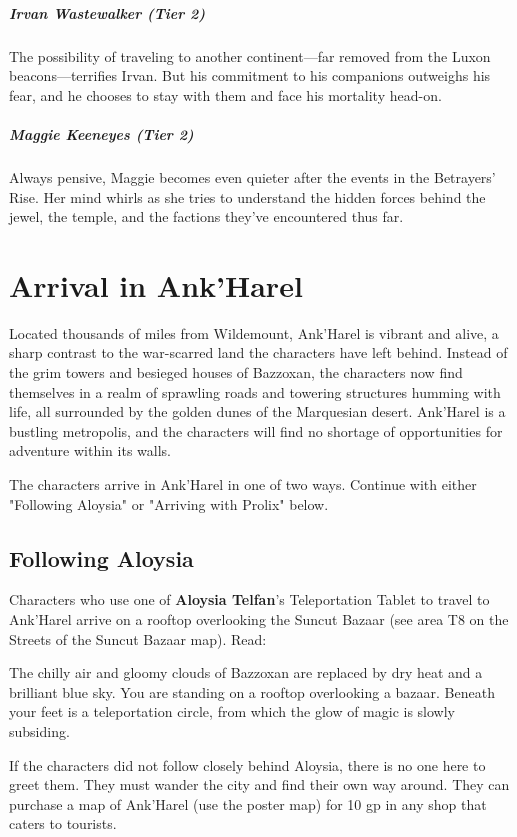 \documentclass[10pt,a4paper,twoside,bg=print,twocolumn,openany,nodeprecatedcode]{dndbook}
\begin{document}
\subparagraph{Irvan Wastewalker (Tier 2)}
The possibility of traveling to another continent—far removed from the Luxon beacons—terrifies Irvan. But his commitment to his companions outweighs his fear, and he chooses to stay with them and face his mortality head-on.

\subparagraph{Maggie Keeneyes (Tier 2)}
Always pensive, Maggie becomes even quieter after the events in the Betrayers' Rise. Her mind whirls as she tries to understand the hidden forces behind the jewel, the temple, and the factions they've encountered thus far.

\section{Arrival in Ank'Harel}
Located thousands of miles from Wildemount, Ank'Harel is vibrant and alive, a sharp contrast to the war-scarred land the characters have left behind. Instead of the grim towers and besieged houses of Bazzoxan, the characters now find themselves in a realm of sprawling roads and towering structures humming with life, all surrounded by the golden dunes of the Marquesian desert. Ank'Harel is a bustling metropolis, and the characters will find no shortage of opportunities for adventure within its walls.

The characters arrive in Ank'Harel in one of two ways. Continue with either "Following Aloysia" or "Arriving with Prolix" below.

\subsection{Following Aloysia}
Characters who use one of \textbf{Aloysia Telfan}'s Teleportation Tablet to travel to Ank'Harel arrive on a rooftop overlooking the Suncut Bazaar (see area T8 on the Streets of the Suncut Bazaar map). Read:

\begin{DndReadAloud}{}
The chilly air and gloomy clouds of Bazzoxan are replaced by dry heat and a brilliant blue sky. You are standing on a rooftop overlooking a bazaar. Beneath your feet is a teleportation circle, from which the glow of magic is slowly subsiding.

\end{DndReadAloud}

If the characters did not follow closely behind Aloysia, there is no one here to greet them. They must wander the city and find their own way around. They can purchase a map of Ank'Harel (use the poster map) for 10 gp in any shop that caters to tourists.
\end{document}
